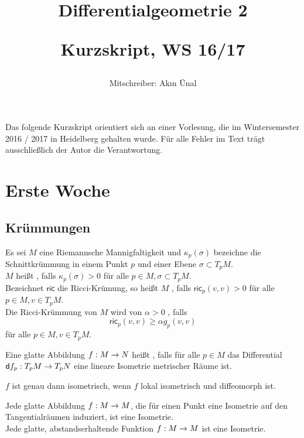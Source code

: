 \documentclass{book}
\renewcommand{\d}{\textsf{d}}
\newcommand{\ric}{\textsf{ric}}
\begin{document}
\title{
\begin{huge}
Differentialgeometrie 2\\
\end{huge}
\begin{large}
Kurzskript, WS 16/17
\end{large}}


\author{Mitschreiber: Ak\i{}n Ünal}
\maketitle
\renewcommand{\i}{^{-1}}

Das folgende Kurzskript orientiert sich an einer Vorlesung, die im Wintersemester 2016 / 2017 in 
Heidelberg gehalten wurde. Für alle Fehler im Text trägt ausschließlich der Autor die Verantwortung.

\setcounter{tocdepth}{1}
\tableofcontents


\chapter{Erste Woche}
\section{Krümmungen}

\Def{}
Es sei $M$ eine Riemannsche Mannigfaltigkeit und $\kappa_p(\sigma)$ bezeichne die Schnittkrümmung in einem Punkt $p$ und einer Ebene $\sigma \subset T_pM$.\\
$M$ heißt , falls $\kappa_p(\sigma) > 0$ für alle $p \in M, \sigma \subset T_pM$.\\
Bezeichnet $\ric$ die Ricci-Krümung, so heißt $M$ , falls $\ric_p(v,v) > 0$ für alle $p \in M, v \in T_pM$.\\
Die Ricci-Krümmung von $M$ wird von $\alpha > 0$ , falls
\[ \ric_p(v,v) \geq \alpha g_p(v,v) \]
für alle $p \in M, v \in T_pM$.

Eine glatte Abbildung $f : M \overset{}{\rightarrow} N$ heißt , falls für alle $p \in M$ das Differential $\d f_p : T_pM \pfeil{} T_pN$ eine lineare Isometrie metrischer Räume ist.

\Bem{}
$f$ ist genau dann isometrisch, wenn $f$ lokal isometrisch und diffeomorph ist.

\Satz{}
Jede glatte Abbildung $f : M \overset{}{\rightarrow} M$, die für einen Punkt eine Isometrie auf den Tangentialräumen induziert, ist eine Isometrie.\\
Jede glatte, abstandserhaltende Funktion $f : M \overset{}{\rightarrow} M$ ist eine Isometrie.
\end{document}

